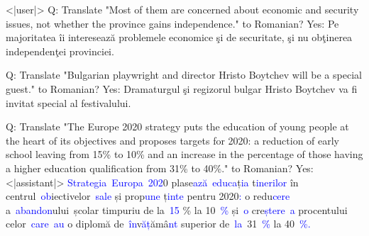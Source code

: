 \documentclass{article}
\begin{document}
\begin{tcolorbox}[colframe=black,colback=white]
<|user|>
Q: Translate "Most of them are concerned about economic and security issues, not whether the province gains independence." to Romanian?
Yes: Pe majoritatea îi interesează problemele economice şi de securitate, şi nu obţinerea independenţei provinciei.

Q: Translate "Bulgarian playwright and director Hristo Boytchev will be a special guest." to Romanian?
Yes: Dramaturgul şi regizorul bulgar Hristo Boytchev va fi invitat special al festivalului.

Q: Translate "The Europe 2020 strategy puts the education of young people at the heart of its objectives and proposes targets for 2020: a reduction of early school leaving from 15\% to 10\% and an increase in the percentage of those having a higher education qualification from 31\% to 40\%." to Romanian?
Yes:
<|assistant|>
\textcolor{blue}{Str}\textcolor{blue}{ateg}\textcolor{blue}{ia}\textcolor{blue}{~Europa}\textcolor{blue}{~}\textcolor{blue}{202}0 plase\textcolor{blue}{ază}\textcolor{blue}{~edu}\textcolor{blue}{ca}ț\textcolor{blue}{ia} t\textcolor{blue}{iner}\textcolor{blue}{ilor} în centrul\textcolor{blue}{~ob}iectivelor\textcolor{blue}{~sale} și prop\textcolor{blue}{une} ț\textcolor{blue}{inte} pentru 2020\textcolor{blue}{:} o redu\textcolor{blue}{c}\textcolor{blue}{ere} a\textcolor{blue}{~abandon}ului\textcolor{blue}{~}școlar timpuriu de la\textcolor{blue}{~}\textcolor{blue}{15} \% la 10\textcolor{blue}{~\%} și\textcolor{blue}{~o} cre\textcolor{blue}{ș}\textcolor{blue}{tere}\textcolor{blue}{~a} procentului celor\textcolor{blue}{~care}\textcolor{blue}{~au} o diplomă de\textcolor{blue}{~în}v\textcolor{blue}{ă}\textcolor{blue}{ț}ămâ\textcolor{blue}{nt} superior de\textcolor{blue}{~la}\textcolor{blue}{~}31\textcolor{blue}{~\%} la 40\textcolor{blue}{~\%.}\textcolor{blue}{}
\end{tcolorbox}
\end{document}
